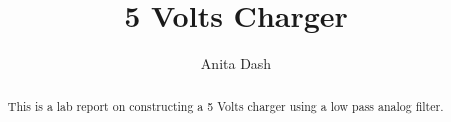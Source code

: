 \documentclass[journal,12pt,twocolumn]{IEEEtran}
\begin{document}
\let\StandardTheFigure\thefigure
\renewcommand{\thefigure}{\arabic{section}.\arabic{figure}}
\makeatletter
{}
\makeatother
\def\putbox#1#2#3{\makebox[0in][l]{\makebox[#1][l]{}\raisebox{\baselineskip}[0in][0in]{\raisebox{#2}[0in][0in]{#3}}}}
     \def\rightbox#1{\makebox[0in][r]{#1}}
     \def\centbox#1{\makebox[0in]{#1}}
     \def\topbox#1{\raisebox{-\baselineskip}[0in][0in]{#1}}
     \def\midbox#1{\raisebox{-0.5\baselineskip}[0in][0in]{#1}}
\vspace{3cm}
\title{5 Volts Charger}
\author{Anita Dash}
\maketitle
\tableofcontents
\renewcommand{\thetable}{\theenumi}
\bigskip
\begin{abstract}
    This is a lab report on constructing a 5 Volts charger using
    a low pass analog filter.
\end{abstract}
\end{document}
